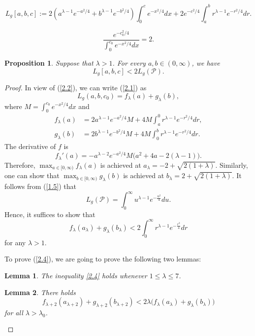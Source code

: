 \documentclass[10pt,a4paper]{amsart}
\newtheorem{prop}{Proposition}
\newtheorem{lem}{Lemma}
\begin{document}
\begin{equation}\label{2.1}
L_g[a,b,c]
:=2(a^{\lambda-1} e^{-a^2/4}+b^{\lambda-1} e^{-b^2/4})\int_0^ce^{-x^2/4}dx
+2e^{-c^2/4}\int_a^b r^{\lambda-1} e^{-r^2/4}dr.
\end{equation}

\begin{equation}\label{2.2}
\frac{e^{-c_0^2/4}}{\int_0^{c_0}e^{-x^2/4}dx}=2.
\end{equation}

\begin{prop}\label{prop9}
Suppose that $\lambda>1$.
For every $a,b\in (0,\infty)$, we have
$$L_g[a,b,c]<2L_g(\mathcal{P}).$$
\end{prop}

\begin{proof}
In view of (\ref{2.2}), we can write (\ref{2.1}) as
$$L_g(a,b,c_0)=f_\lambda(a)+g_\lambda(b),$$
where $M=\displaystyle\int_0^{c_0}e^{-x^2/4}dx$ and
\begin{equation*}
\begin{split}
f_\lambda(a)&=2a^{\lambda-1} e^{-a^2/4}M+4M\int_a^0r^{\lambda-1} e^{-r^2/4}dr,\\
g_\lambda(b)&=2b^{\lambda-1} e^{-b^2/4}M+4M\int_0^br^{\lambda-1} e^{-r^2/4}dr.
\end{split}
\end{equation*}
The derivative of $f$ is
$$f_\lambda'(a)=-a^{\lambda-2}e^{-a^2/4}M\big(a^2+4a-2(\lambda-1)\big).$$
Therefore, $\displaystyle\max_{a\in[0,\infty)}f_\lambda(a)$
is achieved at $a_\lambda=-2+\sqrt{2(1+\lambda)}$.
Similarly, one can show that
$\displaystyle\max_{b\in[0,\infty)}g_\lambda(b)$
is achieved at $b_\lambda=2+\sqrt{2(1+\lambda)}$.
It follows from (\ref{1.5}) that
$$L_g(\mathcal{P})=\int_0^\infty u^{\lambda-1} e^{-\frac{u^2}{4}}du.$$
Hence, it suffices to show that
\begin{equation}\label{2.4}
f_\lambda(a_{\lambda})+g_\lambda(b_\lambda)<2\int_0^\infty r^{\lambda-1} e^{-\frac{r^2}{4}}dr
\end{equation}
for any $\lambda>1$.

To prove (\ref{2.4}), we are going to prove the following two lemmas:


\begin{lem}\label{induction_lem}
The inequality \eqref{2.4} holds whenever $1\leq \lambda\leq 7$.
\end{lem}


\begin{lem}\label{lem10} There holds
\begin{equation}\label{2.3}
f_{\lambda+2}(a_{\lambda+2})+g_{\lambda+2}(b_{\lambda+2})
<2\lambda\big(f_{\lambda}(a_{\lambda})+g_{\lambda}(b_{\lambda})\big)
\end{equation}
for all $\lambda>\lambda_0$.
\end{lem}


\end{proof}
\end{document}
